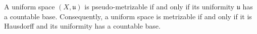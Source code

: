A uniform space $(X, \mathfrak{u})$ is pseudo-metrizable if and only if its uniformity $\mathfrak{u}$ has a countable base. Consequently, a uniform space is metrizable if and only if it is Hausdorff and its uniformity has a countable base.
